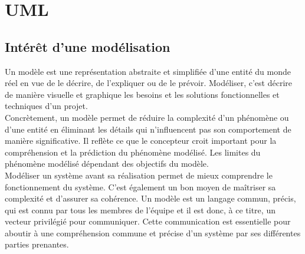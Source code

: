 \chapter{UML}

\section{Intérêt d'une modélisation}
Un modèle est une représentation abstraite et simplifiée d'une entité du monde réel en vue de le décrire, de l'expliquer ou de le prévoir. Modéliser, c’est décrire de manière visuelle et graphique les besoins et les solutions fonctionnelles et techniques d'un projet.\\
Concrètement, un modèle permet de réduire la complexité d'un phénomène ou d'une entité en éliminant les détails qui n'influencent pas son comportement de manière significative. Il reflète ce que le concepteur croit important pour la compréhension et la prédiction du phénomène modélisé. Les limites du phénomène modélisé dépendant des objectifs du modèle.\\
Modéliser un système avant sa réalisation permet de mieux comprendre le fonctionnement du système. C’est également un bon moyen de maîtriser sa complexité et d’assurer sa cohérence. Un modèle est un langage commun, précis, qui est connu par tous les membres de l’équipe et il est donc, à ce titre, un vecteur privilégié pour communiquer. Cette communication est essentielle pour aboutir à une compréhension commune  et précise d'un système par ses différentes parties prenantes.

